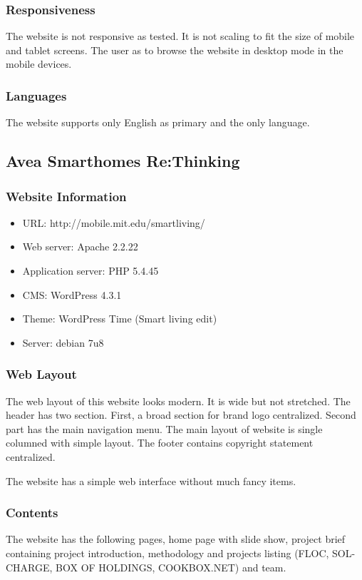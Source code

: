 \subsubsection*{Responsiveness}
The website is not responsive as tested. It is not scaling to fit the size of mobile and tablet screens. The user as to browse the website in desktop mode in the mobile devices.

\subsubsection*{Languages}
The website supports only English as primary and the only language.

\subsection{Avea Smarthomes Re:Thinking}
\subsubsection*{Website Information}
\begin{itemize}
\item URL: http://mobile.mit.edu/smartliving/
\item Web server: Apache 2.2.22
\item Application server: PHP 5.4.45
\item CMS: WordPress 4.3.1
\item Theme: WordPress Time (Smart living edit)
\item Server: debian 7u8
\end{itemize}

\subsubsection*{Web Layout}
The web layout of this website looks modern. It is wide but not stretched. The header has two section. First, a broad section for brand logo centralized. Second part has the main navigation menu. The main layout of website is single columned with simple layout. The footer contains copyright statement centralized.

The website has a simple web interface without much fancy items.

\subsubsection*{Contents}
The website has the following pages, home page with slide show, project brief containing project introduction, methodology and projects listing (FLOC, SOL-CHARGE, BOX OF HOLDINGS, COOKBOX.NET) and team.

